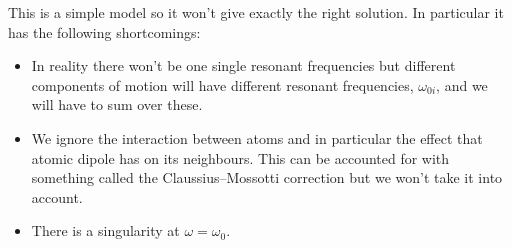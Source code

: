     This is a simple model so it won't give exactly the right solution.
    In particular it has the following shortcomings:
    \begin{itemize}
        \item In reality there won't be one single resonant frequencies but different components of motion will have different resonant frequencies, \(\omega_{0i}\), and we will have to sum over these.
        
        \item We ignore the interaction between atoms and in particular the effect that atomic dipole has on its neighbours.
        This can be accounted for with something called the Claussius--Mossotti correction but we won't take it into account.
        
        \item There is a singularity at \(\omega = \omega_0\).
    \end{itemize}
    

